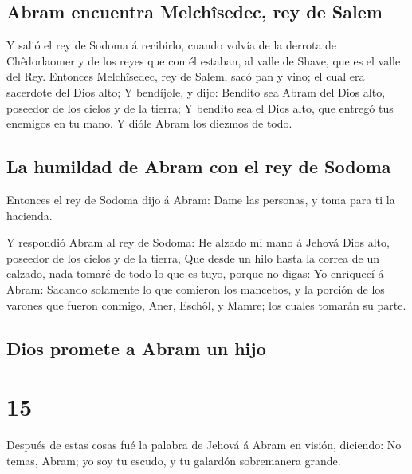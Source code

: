 \hypertarget{abram-encuentra-melchuxeesedec-rey-de-salem}{%
\subsection{Abram encuentra Melchîsedec, rey de
Salem}\label{abram-encuentra-melchuxeesedec-rey-de-salem}}

 Y salió el rey de Sodoma á recibirlo, cuando volvía de
la derrota de Chêdorlaomer y de los reyes que con él estaban, al valle
de Shave, que es el valle del Rey.  Entonces Melchîsedec,
rey de Salem, sacó pan y vino; el cual era sacerdote del Dios alto;
 Y bendíjole, y dijo: Bendito sea Abram del Dios alto,
poseedor de los cielos y de la tierra;  Y bendito sea el
Dios alto, que entregó tus enemigos en tu mano. Y dióle Abram los
diezmos de todo.

\hypertarget{la-humildad-de-abram-con-el-rey-de-sodoma}{%
\subsection{La humildad de Abram con el rey de
Sodoma}\label{la-humildad-de-abram-con-el-rey-de-sodoma}}

 Entonces el rey de Sodoma dijo á Abram: Dame las
personas, y toma para ti la hacienda.

 Y respondió Abram al rey de Sodoma: He alzado mi mano á
Jehová Dios alto, poseedor de los cielos y de la tierra, 
Que desde un hilo hasta la correa de un calzado, nada tomaré de todo lo
que es tuyo, porque no digas: Yo enriquecí á Abram: 
Sacando solamente lo que comieron los mancebos, y la porción de los
varones que fueron conmigo, Aner, Eschôl, y Mamre; los cuales tomarán su
parte.

\hypertarget{dios-promete-a-abram-un-hijo}{%
\subsection{Dios promete a Abram un
hijo}\label{dios-promete-a-abram-un-hijo}}

\hypertarget{section-01-15}{%
\section{15}\label{section-01-15}}

 Después de estas cosas fué la palabra de Jehová á Abram
en visión, diciendo: No temas, Abram; yo soy tu escudo, y tu galardón
sobremanera grande.

